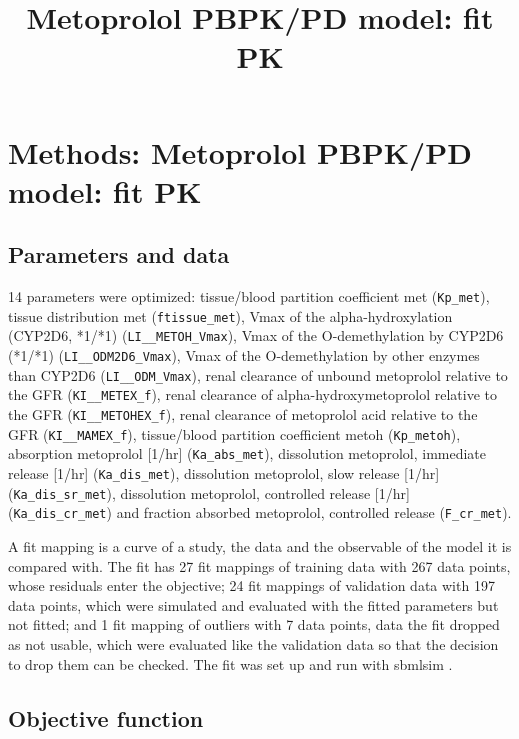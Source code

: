 \documentclass{article}
\title{Metoprolol PBPK/PD model: fit PK}
\date{}
\begin{document}
\maketitle

\section{Methods: Metoprolol PBPK/PD model: fit PK}

\subsection{Parameters and data}

14 parameters were optimized: tissue/blood partition coefficient met (\texttt{Kp\_met}), tissue distribution met (\texttt{ftissue\_met}), Vmax of the alpha-hydroxylation (CYP2D6, *1/*1) (\texttt{LI\_\_METOH\_Vmax}), Vmax of the O-demethylation by CYP2D6 (*1/*1) (\texttt{LI\_\_ODM2D6\_Vmax}), Vmax of the O-demethylation by other enzymes than CYP2D6 (\texttt{LI\_\_ODM\_Vmax}), renal clearance of unbound metoprolol relative to the GFR (\texttt{KI\_\_METEX\_f}), renal clearance of alpha-hydroxymetoprolol relative to the GFR (\texttt{KI\_\_METOHEX\_f}), renal clearance of metoprolol acid relative to the GFR (\texttt{KI\_\_MAMEX\_f}), tissue/blood partition coefficient metoh (\texttt{Kp\_metoh}), absorption metoprolol [1/hr] (\texttt{Ka\_abs\_met}), dissolution metoprolol, immediate release [1/hr] (\texttt{Ka\_dis\_met}), dissolution metoprolol, slow release [1/hr] (\texttt{Ka\_dis\_sr\_met}), dissolution metoprolol, controlled release [1/hr] (\texttt{Ka\_dis\_cr\_met}) and fraction absorbed metoprolol, controlled release (\texttt{F\_cr\_met}).

A fit mapping is a curve of a study, the data and the observable of the model it is compared with. The fit has 27 fit mappings of training data with 267 data points, whose residuals enter the objective; 24 fit mappings of validation data with 197 data points, which were simulated and evaluated with the fitted parameters but not fitted; and 1 fit mapping of outliers with 7 data points, data the fit dropped as not usable, which were evaluated like the validation data so that the decision to drop them can be checked. The fit was set up and run with sbmlsim \cite{Koenig2026_sbmlsim}.

\subsection{Objective function}
\end{document}
